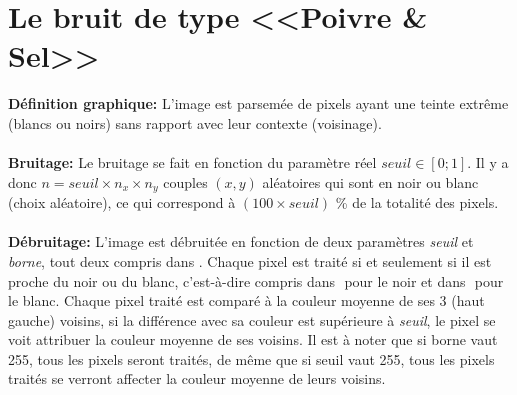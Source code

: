 \documentclass{article}
\begin{document}
		\section{Le bruit de type <<Poivre \& Sel>>}
		\textbf{Définition graphique: }L'image est parsemée de pixels ayant une teinte extrême (blancs ou noirs) sans rapport avec leur contexte (voisinage).\\\\
		\textbf{Bruitage: }Le bruitage se fait en fonction du paramètre réel \begin{math}seuil\in[0;1]\end{math}. Il y a donc \begin{math}n = seuil\times n_x\times n_y\end{math} couples \begin{math}(x, y)\end{math} aléatoires qui sont en noir ou blanc (choix aléatoire), ce qui correspond à \begin{math}(100\times seuil)\end{math} \% de la totalité des pixels.\\\\
		\textbf{Débruitage: }L'image est débruitée en fonction de deux paramètres \emph{seuil} et \emph{borne}, tout deux compris dans \begin{math}[0;255]\end{math}. Chaque pixel est traité si et seulement si il est proche du noir ou du blanc, c'est-à-dire compris dans \begin{math}[0;borne]\end{math} pour le noir et dans \begin{math}[255-borne;255]\end{math} pour le blanc. Chaque pixel traité est comparé à la couleur moyenne de ses 3 (haut gauche) voisins, si la différence avec sa couleur est supérieure à \emph{seuil}, le pixel se voit attribuer la couleur moyenne de ses voisins. Il est à noter que si borne vaut 255, tous les pixels seront traités, de même que si seuil vaut 255, tous les pixels traités se verront affecter la couleur moyenne de leurs voisins.\\\\
\end{document}
